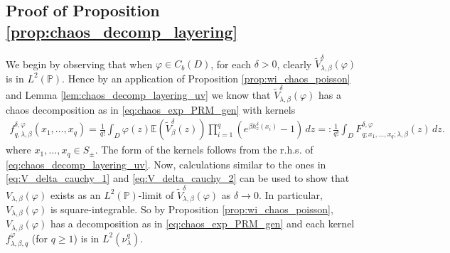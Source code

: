 \documentclass[a4paper, 11pt, reqno]{amsart}
\theoremstyle{definition} \newtheorem{defn}{Definition}[section]
\theoremstyle{remark} \newtheorem{rem}[defn]{Remark}
\theoremstyle{remark} \newtheorem*{rem*}{Remark}
\theoremstyle{plain} \newtheorem{thm}[defn]{Theorem}
\theoremstyle{plain} \newtheorem{lem}[defn]{Lemma}
\theoremstyle{plain} \newtheorem{prop}[defn]{Proposition}
\theoremstyle{plain} \newtheorem{cor}[defn]{Corollary}
\theoremstyle{remark} \newtheorem{exm}[defn]{\textbf{Example}}
\theoremstyle{remark} \newtheorem{exms}[defn]{\textbf{Examples}}
\theoremstyle{remark} \newtheorem*{bl}{}
\numberwithin{equation}{section} %
\newcommand{\pr}{\mathbb{P}}
\newcommand{\E}{\mathbb{E}}
\newcommand{\clpl}{\color{purple} }
\begin{document}
    \subsection{Proof of Proposition \ref{prop:chaos_decomp_layering}}\label{app:proof_chaos_decomp_layering}
    We begin by observing that when $\varphi \in C_b(D)$, for each $\delta>0$, clearly $\tilde{V}^{\delta}_{\lambda, \beta}(\varphi)$ is in $L^2(\pr)$. Hence by an application of Proposition \ref{prop:wi_chaos_poisson} and Lemma \ref{lem:chaos_decomp_layering_uv} we know that $\tilde{V}^{\delta}_{\lambda,\beta}(\varphi)$ has a chaos decomposition as in \eqref{eq:chaos_exp_PRM_gen} with kernels     \begin{align}\label{eq:chaos_decomp_layering_4}
			f^{\delta, \varphi}_{q, \lambda, \beta} (x_1, \ldots, x_q) = \frac{1}{q!}  \int_D \varphi(z) \E(\tilde{V}^{\delta}_{\beta}(z)) \prod_{i=1}^{q} \left(e^{\beta h^{\delta}_z(x_i)}-1\right) \, dz
			=:  \frac{1}{q!} \int_D F^{\delta, \varphi}_{q; x_1, \ldots, x_q; \lambda, \beta} (z ) \,  dz .
	\end{align}
    where $x_1, \ldots, x_q \in S_{\pm}$. The form of the kernels follows from the r.h.s. of \eqref{eq:chaos_decomp_layering_uv}. Now, calculations similar to the ones in \eqref{eq:V_delta_cauchy_1} and \eqref{eq:V_delta_cauchy_2} can be used to show that $V_{\lambda,\beta}(\varphi)$ exists as an $L^2(\pr)$-limit of $\tilde{V}^{\delta}_{\lambda,\beta}(\varphi)$ as $\delta \to 0$. In particular, $V_{\lambda, \beta}(\varphi)$ is square-integrable. So by Proposition \ref{prop:wi_chaos_poisson}, $V_{\lambda, \beta}(\varphi)$ has a decomposition as in \eqref{eq:chaos_exp_PRM_gen} and each kernel $f^{\varphi}_{\lambda, \beta, q}$ (for $q\ge 1$) is in $L^2(\nu_{\lambda}^q)$.
    
\end{document}
